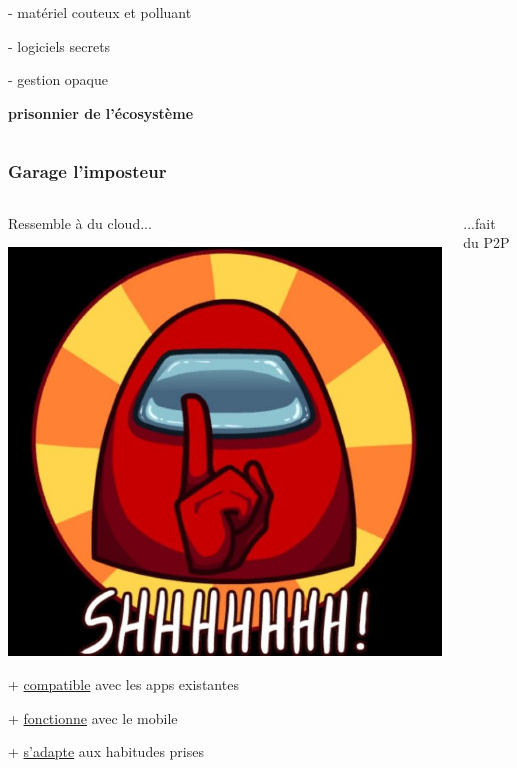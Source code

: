 \documentclass[aspectratio=169]{beamer}
\begin{document}
\begin{frame}[t]
\begin{columns}[t]
\begin{column}{0.5\textwidth}
	- matériel couteux et polluant

	- logiciels secrets

	- gestion opaque

	\vspace{0.2cm}
	\textbf{prisonnier de l'écosystème}
\end{column}
\end{columns}
\end{frame}

\begin{frame}[t]
	\frametitle{Garage l'imposteur}

\begin{columns}[t]
\begin{column}{0.5\textwidth}
	{\huge Ressemble à du cloud...}
 
\begin{center}
	\includegraphics[scale=0.5]{img/shh.jpg}
\end{center}

+ \underline{compatible} avec les apps existantes

+ \underline{fonctionne} avec le mobile

+ \underline{s'adapte} aux habitudes prises


\end{column}

\pause
\begin{column}{0.5\textwidth}
	{\huge ...fait du P2P}


\end{column}
\end{columns}
\end{frame}
\end{document}
